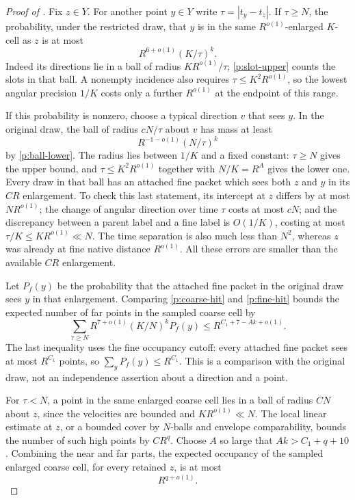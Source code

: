 \begin{proof}[Proof of ]
Fix $z\in Y$.  For another point $y\in Y$ write $\tau=|t_y-t_z|$.
If $\tau\geq N$, the probability, under the restricted draw, that $y$ is in
the same $R^{o(1)}$-enlarged $K$-cell as $z$ is at most
\begin{equation}\label{p:coarse-hit}
 R^{6+o(1)}(K/\tau)^k.
\end{equation}
Indeed its directions lie in a ball of radius $KR^{o(1)}/\tau$;
\eqref{p:slot-upper} counts the slots in that ball.  A nonempty incidence
also requires $\tau\leq K^2R^{o(1)}$, so the lowest angular precision
$1/K$ costs only a further $R^{o(1)}$ at the endpoint of this range.

If this probability is nonzero, choose a typical direction $v$ that sees
$y$.  In the original draw, the ball of radius $cN/\tau$ about $v$ has mass
at least
\begin{equation}\label{p:fine-hit}
 R^{-1-o(1)}(N/\tau)^k
\end{equation}
by \eqref{p:ball-lower}.  The radius lies between $1/K$ and a fixed constant:
$\tau\geq N$ gives the upper bound, and
$\tau\leq K^2R^{o(1)}$ together with $N/K=R^A$ gives the lower one.
Every draw in that ball has an attached fine packet which sees both $z$ and
$y$ in its $CR$ enlargement.  To check this last statement, its intercept at
$z$ differs by at most $NR^{o(1)}$; the change of angular direction over
time $\tau$ costs at most $cN$; and the discrepancy between a parent label
and a fine label is $O(1/K)$, costing at most
$\tau/K\leq KR^{o(1)}\ll N$.  The time separation is also much less than
$N^2$, whereas $z$ was already at fine native distance $R^{o(1)}$.
All these errors are smaller than the available $CR$ enlargement.

Let $P_f(y)$ be the probability that the attached fine packet in the original
draw sees $y$ in that enlargement.  Comparing
\eqref{p:coarse-hit} and \eqref{p:fine-hit} bounds the expected number of far
points in the sampled coarse cell by
\begin{equation}\label{p:far-occupancy}
 \sum_{\tau\geq N}R^{7+o(1)}(K/N)^kP_f(y)
 \leq R^{C_1+7-Ak+o(1)}.
\end{equation}
The last inequality uses the fine occupancy cutoff: every attached fine
packet sees at most $R^{C_1}$ points, so $\sum_yP_f(y)\leq R^{C_1}$.
This is a comparison with the original draw, not an independence assertion
about a direction and a point.

For $\tau<N$, a point in the same enlarged coarse cell lies in a ball of
radius $CN$ about $z$, since the velocities are bounded and
$KR^{o(1)}\ll N$.  The local linear estimate at $z$, or a bounded cover by
$N$-balls and envelope comparability, bounds the number of such high points
by $CR^q$.  Choose $A$ so large that $Ak>C_1+q+10$.  Combining the near and
far parts, the expected occupancy of the sampled enlarged coarse cell,
for every retained $z$, is at most
\begin{equation}\label{p:occupancy-upper}
 R^{q+o(1)}.
\end{equation}


\end{proof}
